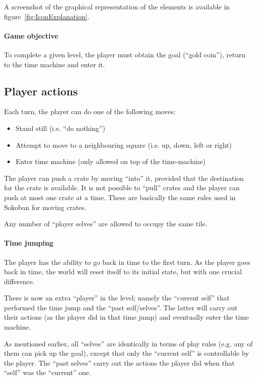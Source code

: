 A screenshot of the graphical representation of the elements is available
in figure~\ref{fig:IconExplanation}.


\paragraph{Game objective}
To complete a given level, the player must obtain the goal (``gold coin''),
return to the time machine and enter it.

\subsection{Player actions}
\label{player-actions}
Each turn, the player can do one of the following moves:

\begin{itemize}
\item Stand still (i.e. ``do nothing'')
\item Attempt to move to a neighbouring square (i.e. up, down, left or right)
\item Enter time machine (only allowed on top of the time-machine)
\end{itemize}

The player can push a crate by moving ``into'' it, provided that the
destination for the crate is available.  It is not possible to
``pull'' crates and the player can push at most one crate at a time.
These are basically the same rules used in Sokoban for moving crates.

Any number of ``player selves'' are allowed to occupy the same
tile.

\paragraph{Time jumping}
\label{time-jumping}
The player has the ability to go back in time to the first turn.  As
the player goes back in time, the world will reset itself to its
initial state, but with one crucial difference.

There is now an extra ``player'' in the level; namely the ``current
self'' that performed the time jump and the ``past self/selves''.  The
latter will carry out their actions (as the player did in that time
jump) and eventually enter the time machine.

As mentioned earlier, all ``selves'' are identically in terms of play
rules (e.g. any of them can pick up the goal), except that only the
``current self'' is controllable by the player.  The ``past selves''
carry out the actions the player did when that ``self'' was the
``current'' one.

